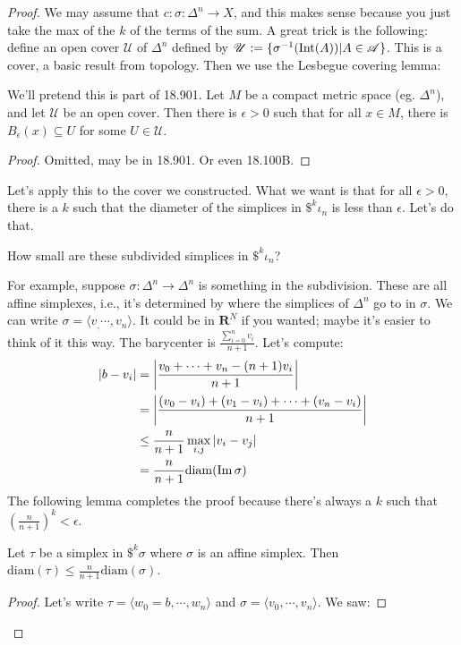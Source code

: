 \begin{proof}
We may assume that $c:\sigma:\Delta^n\to X$, and this makes sense because you just take the max of the $k$ of the terms of the sum. A great trick is the following: define an open cover $\mathscr{U}$ of $\Delta^n$ defined by $\mathscr{U}:=\{\sigma^{-1}(\mathrm{Int}(A))|A\in\mathscr{A}\}$. This is a cover, a basic result from topology. Then we use the Lesbegue covering lemma:
\begin{lemma}
We'll pretend this is part of 18.901. Let $M$ be a compact metric space (eg. $\Delta^n$), and let $\mathscr{U}$ be an open cover. Then there is $\epsilon> 0$ such that for all $x\in M$, there is $B_\epsilon(x)\subseteq U$ for some $U\in \mathscr{U}$.
\end{lemma}
\begin{proof}
Omitted, may be in 18.901. Or even 18.100B.
\end{proof}
Let's apply this to the cover we constructed. What we want is that for all $\epsilon>0$, there is a $k$ such that the diameter of the simplices in $\$^k\iota_n$ is less than $\epsilon$. Let's do that.
\begin{question}
How small are these subdivided simplices in $\$^k\iota_n$?
\end{question}
For example, suppose $\sigma:\Delta^n\to\Delta^n$ is something in the subdivision. These are all affine simplexes, i.e., it's determined by where the simplices of $\Delta^n$ go to in $\sigma$. We can write $\sigma=\langle v_,\cdots,v_n\rangle$. It could be in $\mathbf{R}^N$ if you wanted; maybe it's easier to think of it this way. The barycenter is $\frac{\sum_{i=0}^nv_i}{n+1}$. Let's compute:
\begin{align*}
|b-v_i| & =\left|\frac{v_0+\cdots+v_n-(n+1)v_i}{n+1}\right|\\
& =\left|\frac{(v_0-v_i)+(v_1-v_i)+\cdots+(v_n-v_i)}{n+1}\right|\\
 & \leq \frac{n}{n+1}\max_{i,j}|v_i-v_j|\\
 & = \frac{n}{n+1}\mathrm{diam}(\operatorname{Im}\sigma)
\end{align*}
The following lemma completes the proof because there's always a $k$ such that $\left(\frac{n}{n+1}\right)^k<\epsilon$.
\begin{lemma}
Let $\tau$ be a simplex in $\$^k\sigma$ where $\sigma$ is an affine simplex. Then $\mathrm{diam}(\tau)\leq \frac{n}{n+1}\mathrm{diam}(\sigma)$.
\end{lemma}
\begin{proof}
Let's write $\tau=\langle w_0=b,\cdots,w_n\rangle$ and $\sigma=\langle v_0,\cdots,v_n\rangle$. We saw:

\end{proof}
\end{proof}

